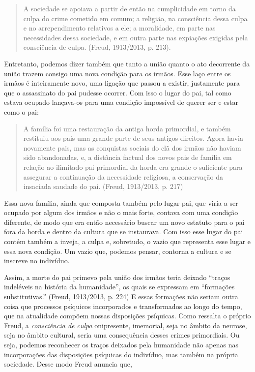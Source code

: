 \begin{quote}
A sociedade se apoiava a partir de então na cumplicidade em torno da
culpa do crime cometido em comum; a religião, na consciência dessa culpa
e no arrependimento relativos a ele; a moralidade, em parte nas
necessidades dessa sociedade, e em outra parte nas expiações exigidas
pela consciência de culpa. (Freud, 1913/2013, p. 213).
\end{quote}

Entretanto, podemos dizer também que tanto a união quanto o ato
decorrente da união trazem consigo uma nova condição para os irmãos.
Esse laço entre os irmãos é inteiramente novo, uma ligação que passou a
existir, justamente para que o assassinato do pai pudesse ocorrer. Com
isso o lugar do pai, tal como estava ocupado lançava-os para uma
condição impossível de querer ser e estar como o pai:

\begin{quote}
A família foi uma restauração da antiga horda primordial, e também
restituiu aos pais uma grande parte de seus antigos direitos. Agora
havia novamente pais, mas as conquistas sociais do clã dos irmãos não
haviam sido abandonadas, e, a distância factual dos novos pais de
família em relação ao ilimitado pai primordial da horda era grande o
suficiente para assegurar a continuação da necessidade religiosa, a
conservação da insaciada saudade do pai. (Freud, 1913/2013, p. 217)
\end{quote}

Essa nova família, ainda que composta também pelo lugar pai, que viria a
ser ocupado por algum dos irmãos e não o mais forte, contava com uma
condição diferente, de modo que era então necessário buscar um novo
estatuto para o pai fora da horda e dentro da cultura que se instaurava.
Com isso esse lugar do pai contém também a inveja, a culpa e, sobretudo,
o vazio que representa esse lugar e essa nova condição. Um vazio que,
podemos pensar, contorna a cultura e se inscreve no indivíduo.

Assim, a morte do pai primevo pela união dos irmãos teria deixado
``traços indeléveis na história da humanidade'', os quais se expressam
em ``formações substitutivas.'' (Freud, 1913/2013, p. 224) E essas
formações não seriam outra coisa que processos psíquicos incorporados e
transformados ao longo do tempo, que na atualidade compõem nossas
disposições psíquicas. Como ressalta o próprio Freud, a
\emph{consciência de culpa} onipresente, imemorial, seja no âmbito da
neurose, seja no âmbito cultural, seria uma consequência desses crimes
primordiais. Ou seja, podemos reconhecer os traços deixados pela
humanidade não apenas nas incorporações das disposições psíquicas do
indivíduo, mas também na própria sociedade. Desse modo Freud anuncia
que,

